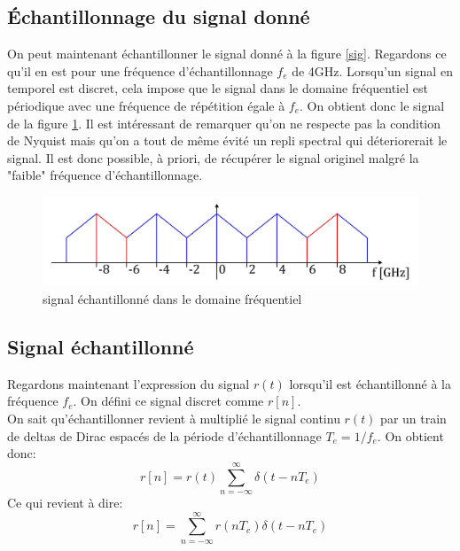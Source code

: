\documentclass[10pt,a4paper]{article}
\begin{document}
\subsection{Échantillonnage du signal donné}
On peut maintenant échantillonner le signal donné à la figure \ref{sig}. Regardons ce qu'il en est pour une fréquence d'échantillonnage $f_e$ de 4GHz. Lorsqu'un signal en temporel est discret, cela impose que le signal dans le domaine fréquentiel est périodique avec une fréquence de répétition égale à $f_e$. On obtient donc le signal de la figure \ref{sig2}. Il est intéressant de remarquer qu'on ne respecte pas la condition de Nyquist mais qu'on a tout de même évité un repli spectral qui déteriorerait le signal. Il est donc possible, à priori, de récupérer le signal originel malgré la "faible" fréquence d'échantillonnage.
\begin{figure}[h!]
\centering
\includegraphics[scale=0.5]{sig2.jpg}
\caption{signal échantillonné dans le domaine fréquentiel}
\label{sig2}
\end{figure}
\subsection{Signal échantillonné}
Regardons maintenant l'expression du signal $r(t)$ lorsqu'il est échantillonné à la fréquence $f_e$. On défini ce signal discret comme $r[n]$.\\
On sait qu'échantillonner revient à multiplié le signal continu $r(t)$ par un train de deltas de Dirac espacés de la période d'échantillonnage $T_e=1/f_e$. On obtient donc:
$$r[n]=r(t)\sum_{n=-\infty}^{\infty}\delta (t-nT_e)$$
Ce qui revient à dire:
$$r[n]=\sum_{n=-\infty}^{\infty}r(nT_e)\delta (t-nT_e)$$
\end{document}
